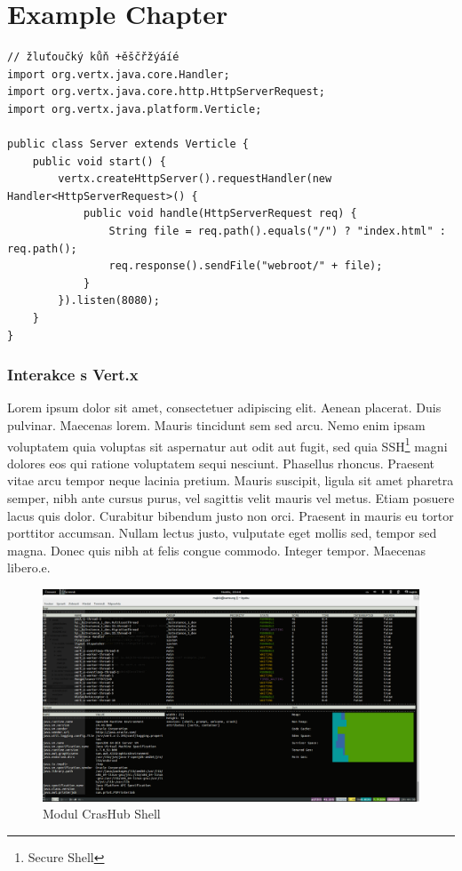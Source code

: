 
\chapter{Example Chapter}


\begin{lstlisting}[caption=Some Java code with UTF-8 comments]
// žluťoučký kůň +ěščřžýáíé
import org.vertx.java.core.Handler;
import org.vertx.java.core.http.HttpServerRequest;
import org.vertx.java.platform.Verticle;

public class Server extends Verticle {
    public void start() {
        vertx.createHttpServer().requestHandler(new Handler<HttpServerRequest>() {
            public void handle(HttpServerRequest req) {
                String file = req.path().equals("/") ? "index.html" : req.path();
                req.response().sendFile("webroot/" + file);
            }
        }).listen(8080);
    }
}
\end{lstlisting}

\subsection{Interakce s Vert.x}\label{sub:interaction}

Lorem ipsum dolor sit amet, consectetuer adipiscing elit. Aenean placerat. Duis pulvinar. Maecenas lorem. Mauris tincidunt sem sed arcu. Nemo enim ipsam voluptatem quia voluptas sit aspernatur aut odit aut fugit, sed quia SSH\footnote{Secure Shell} magni dolores eos qui ratione voluptatem sequi nesciunt. Phasellus rhoncus. Praesent vitae arcu tempor neque lacinia pretium. Mauris suscipit, ligula sit amet pharetra semper, nibh ante cursus purus, vel sagittis velit mauris vel metus. Etiam posuere lacus quis dolor. Curabitur bibendum justo non orci. Praesent in mauris eu tortor porttitor accumsan. Nullam lectus justo, vulputate eget mollis sed, tempor sed magna. Donec quis nibh at felis congue commodo. Integer tempor. Maecenas libero.e.
\begin{figure}[h]
\begin{centering}
\includegraphics[scale=0.21]{images/real_interaction}
\par\end{centering}
\caption{Modul CrasHub Shell\label{fig:real_interaction}}
\end{figure}
